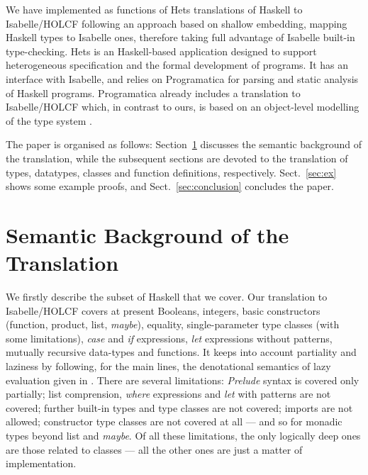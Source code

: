 \documentclass{llncs}
\begin{document}
We have implemented as functions of Hets translations of Haskell to
Isabelle/HOLCF following an approach based on shallow embedding,
mapping Haskell types to Isabelle ones, therefore taking full
advantage of Isabelle built-in type-checking. Hets
\cite{MossaTh,HetsUG,Hets} is an Haskell-based application designed to
support heterogeneous specification and the formal development of
programs. It has an interface with Isabelle, and relies on
Programatica \cite{Prog04} for parsing and static analysis of Haskell
programs.  Programatica already includes a translation to
Isabelle/HOLCF which, in contrast to ours, is based on an object-level
modelling of the type system \cite{Huff}.

The paper is organised as follows: Section~\ref{sec:semantics} discusses
the semantic background of the translation, while the subsequent sections
are devoted to the translation of types, datatypes, classes and function
definitions, respectively. Sect.~\ref{sec:ex} shows some example proofs,
and Sect.~\ref{sec:conclusion} concludes the paper.


\section{Semantic Background of the Translation}
\label{sec:semantics}

We firstly describe the subset of Haskell that we cover.
Our translation to Isabelle/HOLCF covers at present Booleans, integers, basic
constructors (function, product, list, \emph{maybe}), equality,
single-parameter type classes (with some limitations), \emph{case} and
\emph{if} expressions, \emph{let} expressions without patterns, mutually
recursive data-types and functions. 
It keeps into account partiality and laziness by
following, for the main lines, the denotational semantics of lazy evaluation
given in \cite{winskel}. There are several limitations: \emph{Prelude} syntax
is covered only partially; list comprension, \emph{where} expressions and
\emph{let} with patterns are not covered; further built-in types and type
classes are not covered; imports are not allowed; constructor type classes are
not covered at all --- and so for monadic types beyond list and \emph{maybe}.
Of all these limitations, the only logically deep ones are those related to
classes --- all the other ones are just a matter of implementation.
\end{document}
